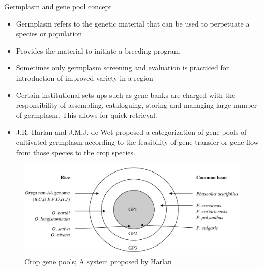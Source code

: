 \documentclass[
  ignorenonframetext,
  aspectratio=169]{beamer}
\providecommand{\tightlist}{%
  \setlength{\itemsep}{0pt}\setlength{\parskip}{0pt}}
\begin{document}
\begin{frame}{Germplasm and gene pool concept}
\protect\hypertarget{germplasm-and-gene-pool-concept}{}
\footnotesize

\begin{itemize}
\tightlist
\item
  Germplasm refers to the genetic material that can be used to
  perpetuate a species or population
\item
  Provides the material to initiate a breeding program
\item
  Sometimes only germplasm screening and evaluation is practiced for
  introduction of improved variety in a region
\item
  Certain institutional sets-ups such as gene banks are charged with the
  responsibility of assembling, cataloguing, storing and managing large
  number of germplasm. This allows for quick retrieval.
\item
  J.R. Harlan and J.M.J. de Wet proposed a categorization of gene pools
  of cultivated germplasm according to the feasibility of gene transfer
  or gene flow from those species to the crop species.
\end{itemize}

\begin{figure}
\includegraphics[width=0.42\linewidth]{./../images/crop_gene_pools} \caption{Crop gene pools; A system proposed by Harlan}\label{fig:gene-pools}
\end{figure}
\end{frame}
\end{document}
